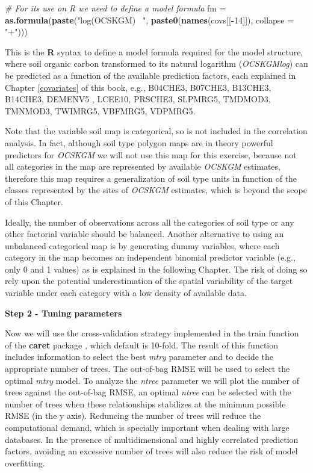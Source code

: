 \documentclass[10pt,b5paper,]{book}
\newenvironment{Shaded}{\begin{snugshade}}{\end{snugshade}}
\newcommand{\CommentTok}[1]{\textcolor[rgb]{0.56,0.35,0.01}{\textit{#1}}}
\newcommand{\DataTypeTok}[1]{\textcolor[rgb]{0.13,0.29,0.53}{#1}}
\newcommand{\DecValTok}[1]{\textcolor[rgb]{0.00,0.00,0.81}{#1}}
\newcommand{\KeywordTok}[1]{\textcolor[rgb]{0.13,0.29,0.53}{\textbf{#1}}}
\newcommand{\NormalTok}[1]{#1}
\newcommand{\OperatorTok}[1]{\textcolor[rgb]{0.81,0.36,0.00}{\textbf{#1}}}
\newcommand{\StringTok}[1]{\textcolor[rgb]{0.31,0.60,0.02}{#1}}
\theoremstyle{definition}
\theoremstyle{definition}
\theoremstyle{definition}
\theoremstyle{remark}
\begin{document}
\begin{Shaded}
\begin{Highlighting}[]
\CommentTok{# For its use on R we need to define a model formula}
\NormalTok{fm =}\StringTok{ }\KeywordTok{as.formula}\NormalTok{(}\KeywordTok{paste}\NormalTok{(}\StringTok{"log(OCSKGM) ~"}\NormalTok{, }\KeywordTok{paste0}\NormalTok{(}\KeywordTok{names}\NormalTok{(covs[[}\OperatorTok{-}\DecValTok{14}\NormalTok{]]),}
                                            \DataTypeTok{collapse =} \StringTok{"+"}\NormalTok{))) }
\end{Highlighting}
\end{Shaded}

This is the \textbf{R} syntax to define a model formula required for the
model structure, where soil organic carbon transformed to its natural
logarithm (\emph{OCSKGMlog}) can be predicted as a function of the
available prediction factors, each explained in Chapter \ref{covariates}
of this book, e.g., B04CHE3, B07CHE3, B13CHE3, B14CHE3, DEMENV5 ,
LCEE10, PRSCHE3, SLPMRG5, TMDMOD3, TMNMOD3, TWIMRG5, VBFMRG5, VDPMRG5.

Note that the variable soil map is categorical, so is not included in
the correlation analysis. In fact, although soil type polygon maps are
in theory powerful predictors for \emph{OCSKGM} we will not use this map
for this exercise, because not all categories in the map are represented
by available \emph{OCSKGM} estimates, therefore this map requires a
generalization of soil type units in function of the classes represented
by the sites of \emph{OCSKGM} estimates, which is beyond the scope of
this Chapter.

Ideally, the number of observations across all the categories of soil
type or any other factorial variable should be balanced. Another
alternative to using an unbalanced categorical map is by generating
dummy variables, where each category in the map becomes an independent
binomial predictor variable (e.g., only 0 and 1 values) as is explained
in the following Chapter. The risk of doing so rely upon the potential
underestimation of the spatial variability of the target variable under
each category with a low density of available data.

\textbf{Step 2 - Tuning parameters}

Now we will use the cross-validation strategy implemented in the train
function of the \textbf{caret} package \citep{kuhn2017caret}, which
default is 10-fold. The result of this function includes information to
select the best \emph{mtry} parameter and to decide the appropriate
number of trees. The out-of-bag RMSE will be used to select the optimal
\emph{mtry} model. To analyze the \emph{ntree} parameter we will plot
the number of trees against the out-of-bag RMSE, an optimal \emph{ntree}
can be selected with the number of trees when these relationships
stabilizes at the minimum possible RMSE (in the y axis). Reduncing the
number of trees will reduce the computational demand, which is specially
important when dealing with large databases. In the presence of
multidimensional and highly correlated prediction factors, avoiding an
excessive number of trees will also reduce the risk of model
overfitting.
\end{document}
